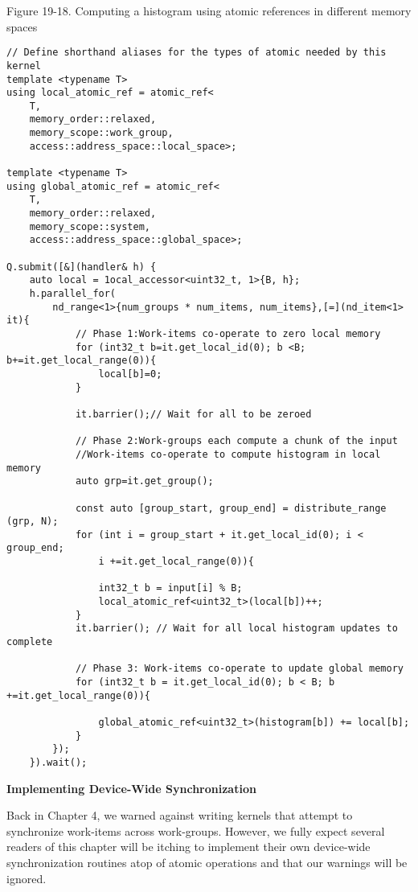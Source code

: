 \hspace*{\fill} \par %
Figure 19-18. Computing a histogram using atomic references in different memory spaces
\begin{lstlisting}[caption={}]
// Define shorthand aliases for the types of atomic needed by this kernel 
template <typename T>
using local_atomic_ref = atomic_ref<
	T,
	memory_order::relaxed, 
	memory_scope::work_group,
	access::address_space::local_space>; 
	
template <typename T>
using global_atomic_ref = atomic_ref<
	T,
	memory_order::relaxed, 
	memory_scope::system,
	access::address_space::global_space>; 
	
Q.submit([&](handler& h) {
	auto local = 1ocal_accessor<uint32_t, 1>{B, h};
	h.parallel_for(
		nd_range<1>{num_groups * num_items, num_items},[=](nd_item<1> it){ 
			// Phase 1:Work-items co-operate to zero local memory
			for (int32_t b=it.get_local_id(0); b <B; b+=it.get_local_range(0)){
				local[b]=0;
			}
		
			it.barrier();// Wait for all to be zeroed
		
			// Phase 2:Work-groups each compute a chunk of the input 
			//Work-items co-operate to compute histogram in local memory 
			auto grp=it.get_group();
		
			const auto [group_start, group_end] = distribute_range (grp, N); 
			for (int i = group_start + it.get_local_id(0); i < group_end; 
				i +=it.get_local_range(0)){
			
				int32_t b = input[i] % B;
				local_atomic_ref<uint32_t>(local[b])++;
			}
			it.barrier(); // Wait for all local histogram updates to complete 
			
			// Phase 3: Work-items co-operate to update global memory
			for (int32_t b = it.get_local_id(0); b < B; b +=it.get_local_range(0)){
				
				global_atomic_ref<uint32_t>(histogram[b]) += local[b];
			}
		});
	}).wait();
\end{lstlisting}

\hspace*{\fill} \par %
\textbf{Implementing Device-Wide Synchronization}

Back in Chapter 4, we warned against writing kernels that attempt to synchronize work-items across work-groups. However, we fully expect several readers of this chapter will be itching to implement their own device-wide synchronization routines atop of atomic operations and that our warnings will be ignored.\par

